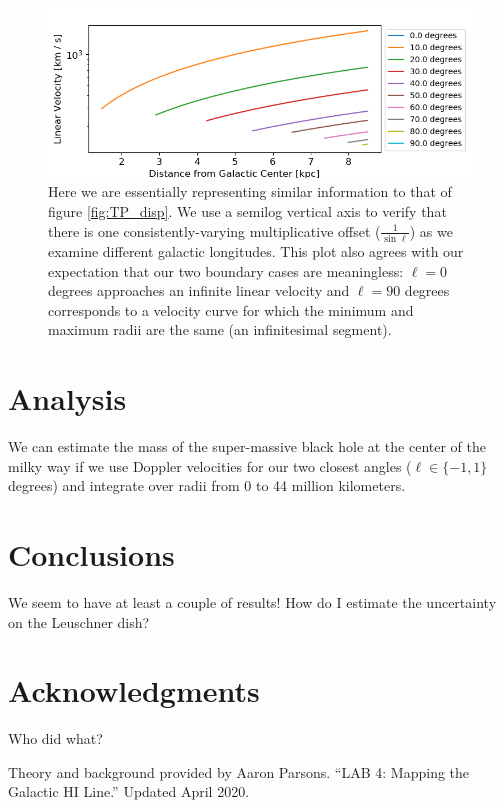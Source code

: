 \documentclass[12pt]{article}
\begin{document}
\begin{figure}
	\centering
	\includegraphics[width=.9\linewidth]{tangentPoint_selected_dispersions}
	\caption{Here we are essentially representing similar information to that of figure \ref{fig:TP_disp}. We use a semilog vertical axis to verify that there is one consistently-varying multiplicative offset ($\frac{1}{\sin \ell}$) as we examine different galactic longitudes. This plot also agrees with our expectation that our two boundary cases are meaningless: $\ell = 0$ degrees approaches an infinite linear velocity and $\ell = 90$ degrees corresponds to a velocity curve for which the minimum and maximum radii are the same (an infinitesimal segment).}
	\label{fig:TP_sel_disp}
\end{figure}

\section{Analysis}

\quad \quad We can estimate the mass of the super-massive black hole at the center of the milky way if we use Doppler velocities for our two closest angles ($\ell \in \{-1, 1\}$ degrees) and integrate over radii from 0 to 44 million kilometers.

\section{Conclusions}

\quad \quad We seem to have at least a couple of results! How do I estimate the uncertainty on the Leuschner dish?

\section{Acknowledgments}

\quad \quad Who did what?

Theory and background provided by Aaron Parsons. ``LAB 4: Mapping the Galactic HI Line.'' Updated April 2020.

\end{document}
